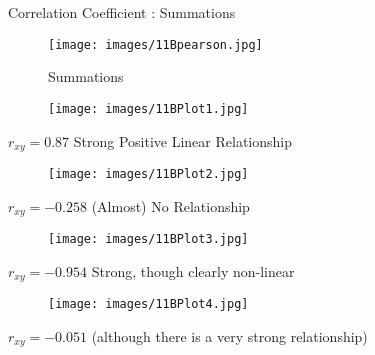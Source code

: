 \documentclass[]{report}
\begin{document}

{Correlation Coefficient : Summations}
\begin{centering}
\begin{figure}
  \texttt{[image: images/11Bpearson.jpg]}\\
  \caption{Summations}\label{11bpear}
\end{figure}
\end{centering}






\begin{figure}
  \texttt{[image: images/11BPlot1.jpg]}\\

\end{figure}
$r_{xy} = 0.87$ Strong Positive Linear Relationship




\begin{figure}
  \texttt{[image: images/11BPlot2.jpg]}\\

\end{figure}

$r_{xy} = -0.258$ (Almost) No Relationship



\begin{figure}
  \texttt{[image: images/11BPlot3.jpg]}\\

\end{figure}

$r_{xy} = -0.954$ Strong, though clearly non-linear




\begin{figure}
  \texttt{[image: images/11BPlot4.jpg]}\\

\end{figure}
$r_{xy} =  -0.051$ (although there is a very strong
relationship)


%
\end{document}
